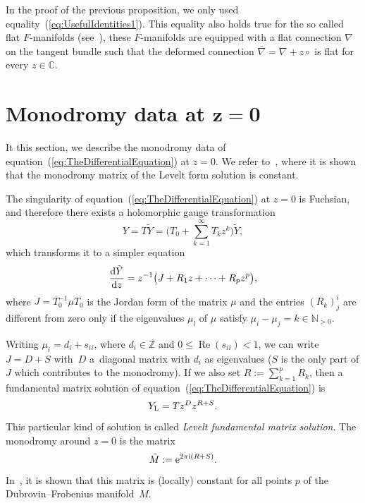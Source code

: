 \documentclass[pdftex]{sigma}
\numberwithin{equation}{section}
\begin{document}
 \begin{Remark}
 In the proof of the previous proposition, we only used equality~(\ref{eq:UsefulIdentities1}). This equality also holds true for the so called flat $F$-manifolds (see~\cite{https://doi.org/10.48550/arxiv.2001.05599,https://doi.org/10.48550/arxiv.2104.09380}), these $F$-manifolds are equipped with a flat connection $\nabla$ on the tangent bundle such that the deformed connection $\bar{\nabla}=\nabla+z\circ$ is flat for every $z\in\mathbb{C}$.
 \end{Remark}

\section[Monodromy data at z=0]{Monodromy data at $\boldsymbol{z=0}$}
 \label{sec:Monodromy}

 It this section, we describe the monodromy data of equation~(\ref{eq:TheDifferentialEquation}) at $z=0$. We refer to~\cite{Dubrovin:1994hc}, where it is shown that the monodromy matrix of the Levelt form solution is constant.

 The singularity of equation~(\ref{eq:TheDifferentialEquation}) at $z=0$ is Fuchsian, and therefore there exists a holomorphic gauge transformation
 \begin{equation*}
 Y=T\tilde{Y}=\Biggl( T_{0}+\sum_{k=1}^{\infty}T_{k}z^{k}\Biggr)\tilde{Y},
 \end{equation*}
 which transforms it to a simpler equation
 \begin{equation*}
 \frac{{\rm d}\tilde{Y}}{{\rm d}z}=z^{-1}\bigl(J+R_{1}z+\cdots+R_{p}z^{p} \bigr),
 \end{equation*}
 where $J=T_{0}^{-1}\mu T_{0}$ is the Jordan form of the matrix $\mu$ and the entries $(R_{k})_{j}^{i}$ are different from zero only if the eigenvalues $\mu_{l}$ of $\mu$ satisfy $\mu_{i}-\mu_{j}=k\in\mathbb{N}_{> 0}$.

 Writing $\mu_{i}=d_{i}+s_{ii}$, where $d_{i}\in\mathbb{Z}$ and $0\leq \operatorname{Re}(s_{ii})<1$,
 we can write $J=D+S$ with~$D$ a~diagonal matrix with $d_{i}$ as eigenvalues ($S$ is the only part of $J$ which contributes to the mono\-dromy). If we also set $R:=\sum_{k=1}^{p}R_{k}$, then a fundamental matrix solution of equation~(\ref{eq:TheDifferentialEquation}) is
 \begin{equation}
 \label{eq:LeveltSolution}
 Y_{\rm L}=Tz^{D}z^{R+S}.
 \end{equation}
 This particular kind of solution is called \emph{Levelt fundamental matrix solution}. The monodromy around $z=0$ is the matrix
 \begin{equation*}
 \tilde{M}:={\rm e}^{2\pi {\rm i}(R+S)}.
 \end{equation*}
 In~\cite{Dubrovin:1994hc}, it is shown that this matrix is (locally) constant for all points $p$ of the Dubrovin--Frobenius manifold~$M$.
\end{document}
